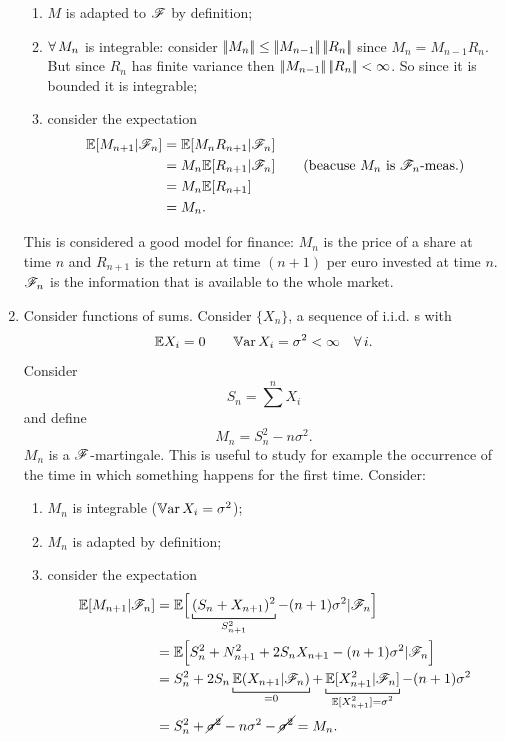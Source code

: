 \documentclass{report}
\begin{document}
\begin{enumerate}
	\begin{enumerate}
		\item $M$ is adapted to $\mathscr{F}$ by definition;
		\item $\forall\, M_{n}$ is integrable: consider $\left|\negthinspace\left|M_{n}\right|\negthinspace\right|\leq\left|\negthinspace\left|M_{n-1}\right|\negthinspace\right|\left|\negthinspace\left|R_{n}\right|\negthinspace\right|$ since $M_{n}=M_{n-1}R_{n}$. But since $R_{n}$ has finite variance then $\left|\negthinspace\left|M_{n-1}\right|\negthinspace\right|\left|\negthinspace\left|R_{n}\right|\negthinspace\right|<\infty$. So since it is bounded it is integrable;
		\item consider the expectation
		\begin{align*}
			\mathbb{E}[M_{n+1}|\mathscr{F}_{n}]&=\mathbb{E}[M_{n}R_{n+1}|\mathscr{F}_{n}]\\
			&=M_{n}\mathbb{E}[R_{n+1}|\mathscr{F}_{n}] \qquad\text{(beacuse $M_n$ is $\mathscr{F}_n$-meas.)}\\
			&=M_{n}\mathbb{E}[R_{n+1}]\\
			&=M_{n}.
		\end{align*}
	\end{enumerate}
	\begin{example}
		This is considered a good model for finance: $M_{n}$ is the price of a share at time $n$ and $R_{n+1}$ is the return at time $(n+1)$ per euro invested at time $n$. $\mathscr{F}_n$ is the information that is available to the whole market.
	\end{example}
	\item  Consider functions of sums. Consider $\{X_{n}\}$, a sequence of i.i.d. \rv s with
	\[\mathbb{E} X_i=0\qquad\mathbb{V}\mathrm{ar}\, X_i=\sigma^{2}<\infty\quad\forall\, i.\]
	Consider
	\[S_{n}=\sum^{n}X_i\]
	and define
	\[M_{n}=S_{n}^{2}-n\sigma^{2}.\]
	$M_n$ is a $\mathscr{F}$-martingale. This is useful to study for example the occurrence of the time in which something happens for the first time. 
	Consider:
	\begin{enumerate}
		\item $M_{n}$ is integrable ($\mathbb{V}\mathrm{ar}\, X_i=\sigma^{2}$);
		\item $M_{n}$ is adapted by definition;
		\item consider the expectation 
		\begin{align*}
			\ev[M_{n+1}|\F_{n}]&=\ev\Big[\underbracket[0.6pt]{(S_{n}+X_{n+1})^{2}}_{S^{2}_{n+1}}-(n+1)\sigma^{2}|\F_{n}\Big]\\
			&=\ev\Big[S_{n}^{2}+N_{n+1}^{2}+2S_{n}X_{n+1}-(n+1)\sigma^{2}|\F_{n}\Big]\\
			&=S_{n}^{2}+2S_{n}\underbracket[0.6pt]{\ev(X_{n+1}|\F_{n})}_{=0}+\underbracket[0.6pt]{\ev[X_{n+1}^{2}|\F_{n}]}_{\mathclap{\ev[X^{2}_{n+1}]=\sigma^{2}}}-(n+1)\sigma^{2}\\
			&=S_{n}^{2}+\cancel{\sigma^{2}}-n\sigma^{2}-\cancel{\sigma^{2}}=M_{n}.

\end{align*}
\end{enumerate}
\end{enumerate}
\end{document}

